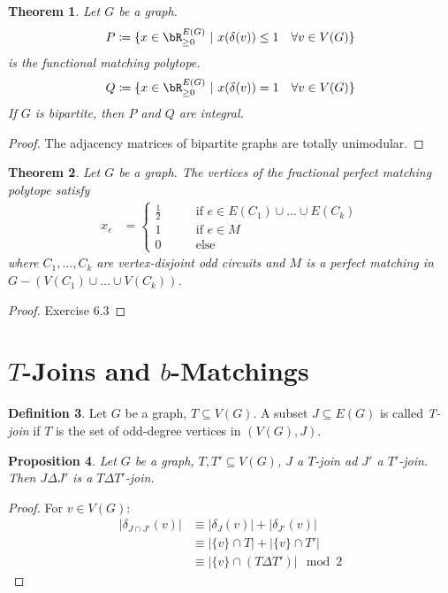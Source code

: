 \documentclass[11pt, a4paper]{article}
\newcommand{\abs}[1]{\left\lvert#1\right\rvert}
\newcommand{\set}[1]{\{#1\}}
\newtheorem{theorem}{Theorem}[section]
\newtheorem{prop}[theorem]{Proposition}
\theoremstyle{remark}
\theoremstyle{definition}
\newtheorem{definition}[theorem]{Definition}
\begin{document}

\begin{theorem}
Let $G$ be a graph.
\[P\coloneqq \set{x\in\bR_{\geq0}^{E(G)}\ |\ x(\delta(v))\leq 1 \quad\forall v\in V(G)}\]
is the functional matching polytope.
\[Q\coloneqq\set{x\in\bR_{\geq0}^{E(G)}\ |\ x(\delta(v))=1 \quad\forall v\in V(G)}\]
If $G$ is bipartite, then $P$ and $Q$ are integral.
\end{theorem}
\begin{proof}
The adjacency matrices of bipartite graphs are totally unimodular.
\end{proof}

\begin{theorem}
Let $G$ be a graph. The vertices of the fractional perfect matching
polytope satisfy
\begin{align*}
	x_e&=\begin{cases}
		\frac{1}{2} \qquad&\text{if }e\in E(C_1)\cup\ldots\cup E(C_k) \\
		1 \qquad&\text{if }e\in M \\
		0 \qquad&\text{else}
	\end{cases}
\end{align*}
where $C_1,\ldots,C_k$ are vertex-disjoint odd circuits and $M$ is a perfect
matching in $G-\left(V(C_1)\cup\ldots\cup V(C_k)\right)$.
\end{theorem}
\begin{proof}
Exercise 6.3
\end{proof}

\section{\texorpdfstring{$T$}{T}-Joins and \texorpdfstring{$b$}{b}-Matchings}
\begin{definition}
Let $G$ be a graph, $T\subseteq V(G)$. A subset $J\subseteq E(G)$ is called
\emph{T-join} if $T$ is the set of odd-degree vertices in $(V(G),J)$.
\end{definition}

\begin{prop}\label{prop:t-join-symm-diff}
Let $G$ be a graph, $T,T'\subseteq V(G)$, $J$ a $T$-join ad $J'$ a $T'$-join.
Then $J\Delta J'$ is a $T\Delta T'$-join.
\end{prop}
\begin{proof}
For $v\in V(G)$:
\begin{align*}
	\abs{\delta_{J\cap J'}(v)}&\equiv \abs{\delta_J(v)}+\abs{\delta_{J'}(v)} \\
	&\equiv \abs{\set{v}\cap T}+\abs{\set{v}\cap T'} \\
	&\equiv \abs{\set{v}\cap (T\Delta T')} \mod 2
\end{align*}
\end{proof}
\end{document}
